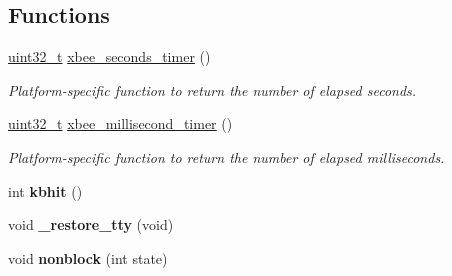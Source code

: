 \subsection*{Functions}
\begin{DoxyCompactItemize}
\item 
\hyperlink{group__hal__dos_ga09a1e304d66d35dd47daffee9731edaa}{uint32\-\_\-t} \hyperlink{group__hal__posix_gad66d00b144089426f04db771be5baa8b}{xbee\-\_\-seconds\-\_\-timer} ()
\begin{DoxyCompactList}\small\item\em Platform-\/specific function to return the number of elapsed seconds. \end{DoxyCompactList}\item 
\hyperlink{group__hal__dos_ga09a1e304d66d35dd47daffee9731edaa}{uint32\-\_\-t} \hyperlink{group__hal__posix_ga63bb246b86f72e88fa8ddc7a429c0e67}{xbee\-\_\-millisecond\-\_\-timer} ()
\begin{DoxyCompactList}\small\item\em Platform-\/specific function to return the number of elapsed milliseconds. \end{DoxyCompactList}\item 
\hypertarget{group__hal__posix_gad5451da499ab9d3907da8dd7060ab677}{int {\bfseries kbhit} ()}\label{group__hal__posix_gad5451da499ab9d3907da8dd7060ab677}

\item 
\hypertarget{group__hal__posix_ga6aa3e8753324b2be527b25c179239bed}{void {\bfseries \-\_\-restore\-\_\-tty} (void)}\label{group__hal__posix_ga6aa3e8753324b2be527b25c179239bed}

\item 
\hypertarget{group__hal__posix_gaf880c0009d395be5bfbd579e7f72f645}{void {\bfseries nonblock} (int state)}\label{group__hal__posix_gaf880c0009d395be5bfbd579e7f72f645}


\end{DoxyCompactItemize}
